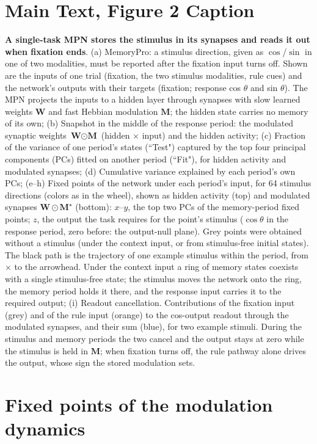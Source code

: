 \documentclass{article}
\begin{document}
\section{Main Text, Figure 2 Caption}
\textbf{A single-task MPN stores the stimulus in its synapses and reads it out when fixation ends}.
(a) MemoryPro: a stimulus direction, given as $\cos$/$\sin$ in one of two modalities, must be reported after the fixation input turns off. Shown are the inputs of one trial (fixation, the two stimulus modalities, rule cues) and the network's outputs with their targets (fixation; response cos $\theta$ and sin $\theta$). The MPN projects the inputs to a hidden layer through synapses with slow learned weights $\textbf{W}$ and fast Hebbian modulation $\textbf{M}$; the hidden state carries no memory of its own;
(b) Snapshot in the middle of the response period: the modulated synaptic weights $\textbf{W} \odot \textbf{M}$ (hidden $\times$ input) and the hidden activity;
(c) Fraction of the variance of one period's states (``Test") captured by the top four principal components (PCs) fitted on another period (``Fit"), for hidden activity and modulated synapses;
(d) Cumulative variance explained by each period's own PCs;
(e--h) Fixed points of the network under each period's input, for 64 stimulus directions (colors as in the wheel), shown as hidden activity (top) and modulated synapses $\mathbf{W}\odot\mathbf{M}^\star$ (bottom): $x$--$y$, the top two PCs of the memory-period fixed points; $z$, the output the task requires for the point's stimulus ($\cos\theta$ in the response period, zero before: the output-null plane). Grey points were obtained without a stimulus (under the context input, or from stimulus-free initial states). The black path is the trajectory of one example stimulus within the period, from $\times$ to the arrowhead. Under the context input a ring of memory states coexists with a single stimulus-free state; the stimulus moves the network onto the ring, the memory period holds it there, and the response input carries it to the required output;
(i) Readout cancellation. Contributions of the fixation input (grey) and of the rule input (orange) to the cos-output readout through the modulated synapses, and their sum (blue), for two example stimuli. During the stimulus and memory periods the two cancel and the output stays at zero while the stimulus is held in $\textbf{M}$; when fixation turns off, the rule pathway alone drives the output, whose sign the stored modulation sets.


\section{Fixed points of the modulation dynamics}
\label{sec:fixed-points}
\end{document}
